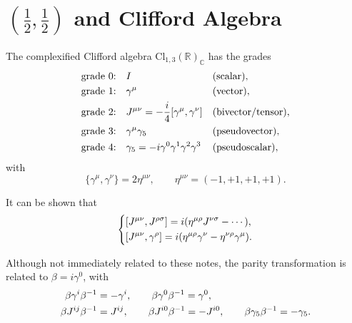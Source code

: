 \section{\texorpdfstring{$(\frac{1}{2}, \frac{1}{2})$}{(1/2,1/2)} and Clifford Algebra}
The complexified Clifford algebra $\mathrm{Cl}_{1,3}(\mathbb R)_{\mathbb C}$ has the grades
\begin{align}
    \text{grade 0:} \quad & I && \text{(scalar)}, \notag \\
    \text{grade 1:} \quad & \gamma^\mu && \text{(vector)}, \notag \\
    \text{grade 2:} \quad & J^{\mu \nu} = - \frac{i}{4} [\gamma^\mu, \gamma^\nu] && \text{(bivector/tensor)}, \notag \\
    \text{grade 3:} \quad & \gamma^\mu \gamma_5 && \text{(pseudovector)}, \notag \\
    \text{grade 4:} \quad & \gamma_5 = - i \gamma^0 \gamma^1 \gamma^2 \gamma^3 && \text{(pseudoscalar)},
\end{align}
with
\begin{equation}
    \{\gamma^\mu, \gamma^\nu\} = 2 \eta^{\mu \nu}, \qquad \eta^{\mu \nu} = (- 1, + 1, + 1, + 1).
\end{equation}
\begin{framed}
    It can be shown that
    \begin{equation}
        \begin{dcases}
            [J^{\mu \nu}, J^{\rho \sigma}] = i (\eta^{\mu \rho} J^{\nu \sigma} - \cdots), \\
            [J^{\mu \nu}, \gamma^\rho] = i (\eta^{\mu \rho} \gamma^\nu - \eta^{\nu \rho} \gamma^\mu).
        \end{dcases}
    \end{equation}
\end{framed}
\begin{framed}
    Although not immediately related to these notes, the parity transformation is related to $\beta = i \gamma^0$, with
    \begin{align}
        \beta \gamma^i \beta^{- 1} & = - \gamma^i, \qquad \beta \gamma^0 \beta^{- 1} = \gamma^0, \notag \\
        \beta J^{i j} \beta^{- 1} & = J^{i j}, \qquad \beta J^{i 0} \beta^{- 1} = - J^{i 0}, \qquad \beta \gamma_5 \beta^{- 1} = - \gamma_5.
    \end{align}
\end{framed}

